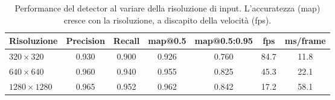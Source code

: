 \documentclass[12pt,a4paper,openright,twoside]{book}
\begin{document}
\begin{table}[t]
  \centering
  \caption{Performance del detector al variare della risoluzione di input. L'accuratezza (\ac{map}) cresce 
  con la risoluzione, a discapito della velocità (\ac{fps}).}
  \label{tab:ablation_resolution}
  \begin{tabular}{l
                  S[table-format=1.3]
                  S[table-format=1.3]
                  S[table-format=1.3]
                  S[table-format=1.3]
                  S[table-format=2.1]
                  S[table-format=2.1]}
    \toprule
    \textbf{Risoluzione} & {\textbf{Precision}} & {\textbf{Recall}} & {\textbf{\ac{map}@0.5}} & 
    {\textbf{\ac{map}@0.5:0.95}} & {\textbf{\ac{fps}}} & {\textbf{ms/frame}}\\
    \midrule
    $320\times320$ & 0.930 & 0.900 & 0.926 & 0.760 & 84.7 & 11.8 \\
    $640\times640$ & 0.960 & 0.940 & 0.955 & 0.825 & 45.3 & 22.1 \\
    $1280\times1280$ & 0.965 & 0.952 & 0.962 & 0.842 & 17.2 & 58.1 \\
    \bottomrule
  \end{tabular}
\end{table}

\end{document}

